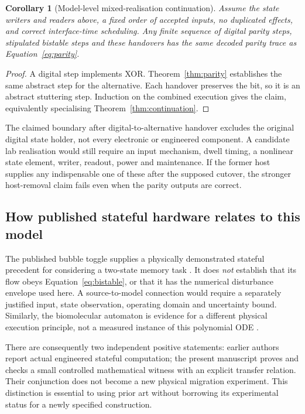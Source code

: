 \documentclass[11pt,a4paper]{article}
\newtheorem{corollary}[theorem]{Corollary}
\theoremstyle{definition}
\theoremstyle{remark}
\begin{document}
\begin{corollary}[Model-level mixed-realisation continuation]\label{cor:paritymigration}
Assume the state writers and readers above, a fixed order of accepted inputs, no duplicated effects, and correct interface-time scheduling. Any finite sequence of digital parity steps, stipulated bistable steps and these handovers has the same decoded parity trace as Equation~\eqref{eq:parity}.
\end{corollary}
\begin{proof}
A digital step implements XOR. Theorem~\ref{thm:parity} establishes the same abstract step for the alternative. Each handover preserves the bit, so it is an abstract stuttering step. Induction on the combined execution gives the claim, equivalently specialising Theorem~\ref{thm:continuation}.
\end{proof}
The claimed boundary after digital-to-alternative handover excludes the original digital state holder, not every electronic or engineered component. A candidate lab realisation would still require an input mechanism, dwell timing, a nonlinear state element, writer, readout, power and maintenance. If the former host supplies any indispensable one of these after the supposed cutover, the stronger host-removal claim fails even when the parity outputs are correct.

\subsection{How published stateful hardware relates to this model}
The published bubble toggle supplies a physically demonstrated stateful precedent for considering a two-state memory task \citep{bubble}. It does \emph{not} establish that its flow obeys Equation~\eqref{eq:bistable}, or that it has the numerical disturbance envelope used here. A source-to-model connection would require a separately justified input, state observation, operating domain and uncertainty bound. Similarly, the biomolecular automaton is evidence for a different physical execution principle, not a measured instance of this polynomial ODE \citep{benenson}.

There are consequently two independent positive statements: earlier authors report actual engineered stateful computation; the present manuscript proves and checks a small controlled mathematical witness with an explicit transfer relation. Their conjunction does not become a new physical migration experiment. This distinction is essential to using prior art without borrowing its experimental status for a newly specified construction.
\end{document}
